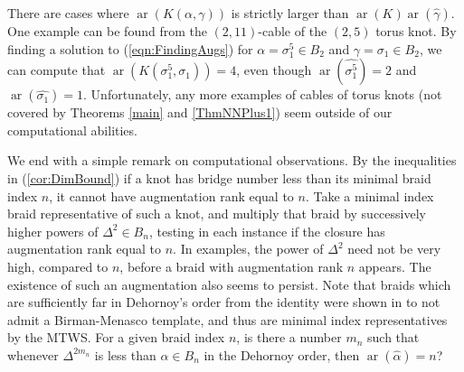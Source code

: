 \documentclass[11pt]{amsart}
\def\s{{\sigma}}
\def\ar{\operatorname{ar}}
\theoremstyle{definition}
\begin{document}
There are cases where $\ar(K(\alpha,\gamma))$ is strictly larger than $\ar(K)\ar(\hat{\gamma})$. One example can be found from the $(2,11)$-cable of the $(2,5)$ torus knot. By finding a solution to (\ref{eqn:FindingAugs}) for $\alpha = \s_1^5\in B_2$ and $\gamma=\s_1\in B_2$, we can compute that $\ar(K(\s_1^5,\s_1)) = 4$, even though $\ar(\hat{\s_1^5})=2$ and $\ar(\hat{\s_1})=1$. Unfortunately, any more examples of cables of torus knots (not covered by Theorems \ref{main} and \ref{ThmNNPlus1}) seem outside of our computational abilities.

We end with a simple remark on computational observations. By the inequalities in (\ref{cor:DimBound}) if a knot has bridge number less than its minimal braid index $n$, it cannot have augmentation rank equal to $n$. Take a minimal index braid representative of such a knot, and multiply that braid by successively higher powers of $\Delta^2\in B_n$, testing in each instance if the closure has augmentation rank equal to $n$. In examples, the power of $\Delta^2$ need not be very high, compared to $n$, before a braid with augmentation rank $n$ appears. The existence of such an augmentation also seems to persist. Note that braids which are sufficiently far in Dehornoy's order from the identity were shown in \cite{MN} to not admit a Birman-Menasco template, and thus are minimal index representatives by the MTWS. For a given braid index $n$, is there a number $m_n$ such that whenever $\Delta^{2m_n}$ is less than $\alpha\in B_n$ in the Dehornoy order, then $\ar(\hat{\alpha}) = n$?



\end{document}
